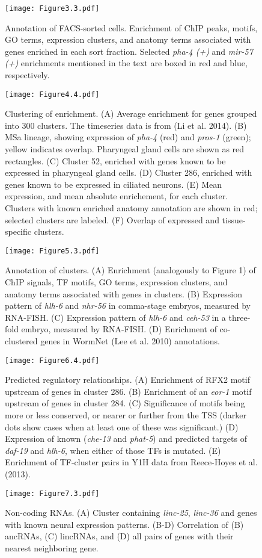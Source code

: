 \documentclass{article}
\begin{document}
\begin{figure}
\texttt{[image: Figure3.3.pdf]}
\caption{
Annotation of FACS-sorted cells. Enrichment of ChIP peaks, motifs, GO terms, expression clusters, and anatomy terms associated with genes enriched in each sort fraction. Selected {\em pha-4 (+)} and {\em mir-57 (+)} enrichments mentioned in the text
are boxed in red and blue, respectively.
}
\end{figure}
\clearpage

\begin{figure}
\texttt{[image: Figure4.4.pdf]}
\caption{
Clustering of enrichment.
(A) Average enrichment for genes grouped into 300 clusters. The timeseries data is from (Li et al. 2014). (B) MSa lineage, showing expression of {\em pha-4} (red) and {\em pros-1} (green); yellow indicates overlap. Pharyngeal gland cells are shown as red rectangles. (C) Cluster 52, enriched with genes known to be expressed in pharyngeal gland cells. (D) Cluster 286, enriched with genes known to be expressed in ciliated neurons. (E) Mean expression, and mean absolute enrichement, for each cluster. Clusters with known enriched anatomy annotation are shown in red; selected clusters are labeled. (F) Overlap of expressed and tissue-specific clusters.
}
\end{figure}
\clearpage

\begin{figure}
\texttt{[image: Figure5.3.pdf]}
\caption{
Annotation of clusters.
(A) Enrichment (analogously to Figure 1) of ChIP signals, TF motifs, GO terms, expression clusters, and anatomy terms associated with genes in clusters. (B) Expression pattern of {\em hlh-6} and {\em nhr-56}
 in comma-stage embryos, measured by RNA-FISH. (C) Expression pattern of {\em hlh-6} and {\em ceh-53} in a three-fold embryo, measured by RNA-FISH.
(D) Enrichment of co-clustered genes in WormNet (Lee et al. 2010) annotations.
}
\end{figure}
\clearpage

\begin{figure}
\texttt{[image: Figure6.4.pdf]}
\caption{Predicted regulatory relationships.
(A) Enrichment of RFX2 motif upstream of genes in cluster 286. (B) Enrichment of an
{\em eor-1} motif upstream of genes in cluster 284. (C) Significance of motifs being more or less conserved, or nearer or further from the TSS (darker dots show cases when
at least one of these was significant.) (D) Expression of known ({\em che-13} and
{\em phat-5}) and predicted targets of {\em daf-19} and {\em hlh-6}, when either of
those TFs is mutated.
 (E) Enrichment of TF-cluster pairs in Y1H data from Reece-Hoyes et al. (2013).
}
\end{figure}
\clearpage

\begin{figure}
\texttt{[image: Figure7.3.pdf]}
\caption{
Non-coding RNAs.
(A) Cluster containing {\em linc-25}, {\em linc-36}
 and genes with known neural expression patterns. (B-D) Correlation of (B) ancRNAs, (C) lincRNAs, and (D) all pairs of genes with their nearest neighboring gene.
}
\end{figure}
\clearpage
\end{document}
